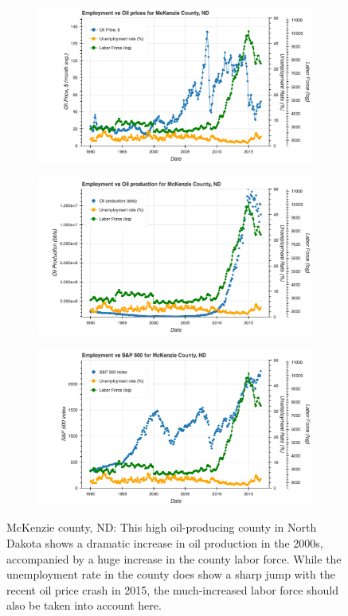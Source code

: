 \documentclass[11pt,letterpaper]{article}
\begin{document}
\begin{figure}
\centering
\begin{subfigure}{0.6\textwidth}
\includegraphics[width=\linewidth]{nd_mckenzie_oil_price}
\end{subfigure}

\begin{subfigure}{0.6\textwidth}
\includegraphics[width=\linewidth]{nd_mckenzie_oil_prod}
\end{subfigure}

\begin{subfigure}{0.6\textwidth}
\includegraphics[width=\linewidth]{nd_mckenzie_snp}
\end{subfigure}
\caption{McKenzie county, ND: This high oil-producing county in North Dakota shows a dramatic increase in oil production in the 2000s, accompanied by a huge increase in the county labor force. While the unemployment rate in the county does show a sharp jump with the recent oil price crash in 2015, the much-increased labor force should also be taken into account here.}
\label{fig:nd_mckenzie}
\end{figure}
\end{document}

